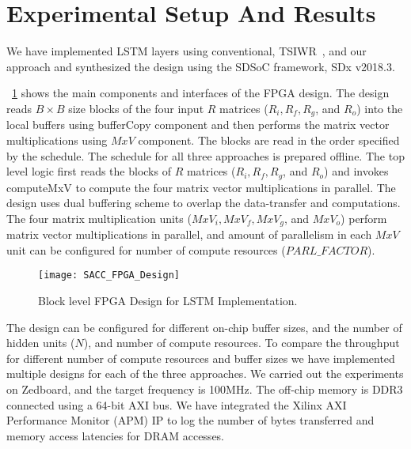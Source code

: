 \section{Experimental Setup And Results}
We have implemented LSTM layers using conventional, TSIWR~\cite{park2020time}, and our approach and synthesized the design using the SDSoC framework, SDx v2018.3. 
\figurename{~\ref{fig:lstmFpgaDesign} shows the main components and interfaces of the FPGA design. The design reads $B{\times}B$ size blocks of the four input $R$ matrices ($R_i, R_f, R_g$, and $R_o$) into the local buffers using bufferCopy component and then performs the matrix vector multiplications using $MxV$ component. The blocks are read in the order specified by the schedule. The schedule for all three approaches is prepared offline. The top level logic first reads the blocks of $R$ matrices ($R_i, R_f, R_g$, and $R_o$) and invokes computeMxV to compute the four matrix vector multiplications in parallel. The design uses dual buffering scheme to overlap the data-transfer and computations. The four matrix multiplication units ($MxV_i, MxV_f, MxV_g$, and $MxV_o$) perform matrix vector multiplications in parallel, and amount of parallelism in each $MxV$ unit can be configured for number of compute resources ($PARL\_FACTOR$). 
\begin{figure}[!htb]
	\centering
	\texttt{[image: SACC\_FPGA\_Design]}
	\caption{Block level FPGA Design for LSTM Implementation.}
	\label{fig:lstmFpgaDesign}
\end{figure}

The design can be configured for different on-chip buffer sizes, and the number of hidden units ($N$), and number of compute resources. To compare the throughput for different number of compute resources and buffer sizes we have implemented multiple designs for each of the three approaches. We carried out the experiments on Zedboard, and the target frequency is 100MHz.  The off-chip memory is DDR3 connected using a 64-bit AXI bus. We have integrated the Xilinx AXI Performance Monitor (APM) IP to log the number of bytes transferred and memory access latencies for DRAM accesses.

}
